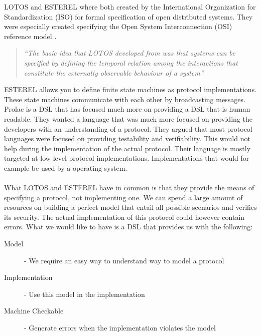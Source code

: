 LOTOS and ESTEREL where both created by the International Organization for Standardization (ISO) for formal specification of open distributed systems. They were especially created specifying the Open System Interconnection (OSI) reference model \cite{day1983osi}.
\begin{quote}
	\textit{``The basic idea that LOTOS developed from was that systems can be specified by defining the temporal relation among the interactions that constitute the externally observable behaviour
of a system''}
	\begin{flushright}
		\cite{bolognesi1987introduction}
	\end{flushright}		
\end{quote}
ESTEREL allows you to define finite state machines as protocol implementations. These state machines communicate with each other by broadcasting messages.
\\
Prolac is a DSL that has focused much more on providing a DSL that is human readable. They wanted a language that was much more focused on providing the developers with an understanding of a protocol. They argued that most protocol languages were focused on providing testability and verifiability. This would not help during the implementation of the actual protocol. Their language is mostly targeted at low level protocol implementations. Implementations that would for example be used by a operating system.
\\\\
What LOTOS and ESTEREL have in common is that they provide the means of specifying a protocol, not implementing one. We can spend a large amount of resources on building a perfect model that entail all possible scenarios and verifies its security. The actual implementation of this protocol could however contain errors. What we would like to have is a DSL that provides us with the following:
\begin{description}
  \item[Model] - We require an easy way to understand way to model a protocol
  \item[Implementation] - Use this model in the implementation   
  \item[Machine Checkable] - Generate errors when the implementation violates the model
\end{description}

